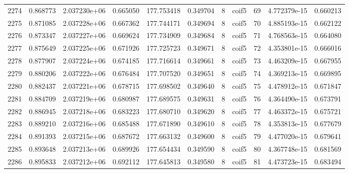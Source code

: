 \begin{tabular}{lrrrrrrlrrr}
2274 &    0.868773 &        2.037230e+06 &  0.665050 &              177.753418 &    0.349704 &       8 &        coif5 &     69 &   4.772379e-15 &      0.660213 \\
2275 &    0.871085 &        2.037228e+06 &  0.667362 &              177.744171 &    0.349694 &       8 &        coif5 &     70 &   4.885193e-15 &      0.662122 \\
2276 &    0.873347 &        2.037227e+06 &  0.669624 &              177.734909 &    0.349684 &       8 &        coif5 &     71 &   4.768563e-15 &      0.664080 \\
2277 &    0.875649 &        2.037225e+06 &  0.671926 &              177.725723 &    0.349671 &       8 &        coif5 &     72 &   4.353801e-15 &      0.666016 \\
2278 &    0.877907 &        2.037224e+06 &  0.674185 &              177.716614 &    0.349661 &       8 &        coif5 &     73 &   4.463209e-15 &      0.667955 \\
2279 &    0.880206 &        2.037222e+06 &  0.676484 &              177.707520 &    0.349651 &       8 &        coif5 &     74 &   4.369213e-15 &      0.669895 \\
2280 &    0.882437 &        2.037221e+06 &  0.678715 &              177.698502 &    0.349640 &       8 &        coif5 &     75 &   4.478912e-15 &      0.671847 \\
2281 &    0.884709 &        2.037219e+06 &  0.680987 &              177.689575 &    0.349631 &       8 &        coif5 &     76 &   4.364490e-15 &      0.673791 \\
2282 &    0.886945 &        2.037218e+06 &  0.683223 &              177.680710 &    0.349620 &       8 &        coif5 &     77 &   4.463372e-15 &      0.675721 \\
2283 &    0.889210 &        2.037216e+06 &  0.685488 &              177.671890 &    0.349610 &       8 &        coif5 &     78 &   4.353813e-15 &      0.677679 \\
2284 &    0.891393 &        2.037215e+06 &  0.687672 &              177.663132 &    0.349600 &       8 &        coif5 &     79 &   4.477020e-15 &      0.679641 \\
2285 &    0.893648 &        2.037213e+06 &  0.689926 &              177.654434 &    0.349590 &       8 &        coif5 &     80 &   4.367748e-15 &      0.681569 \\
2286 &    0.895833 &        2.037212e+06 &  0.692112 &              177.645813 &    0.349580 &       8 &        coif5 &     81 &   4.473723e-15 &      0.683494 \\

\end{tabular}

